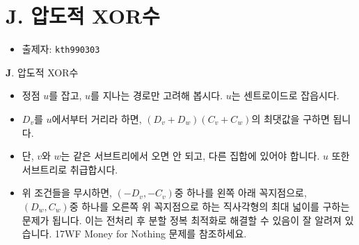 \section{J. 압도적 XOR수}

\begin{frame} %
    \begin{itemize}
        \item 출제자: \texttt{kth990303}
    \end{itemize}
\end{frame}

\begin{frame}{\textbf{J}. 압도적 XOR수}
    \begin{itemize}
        \item 정점 $u$를 잡고, $u$를 지나는 경로만 고려해 봅시다. $u$는 센트로이드로 잡읍시다.
        \item $D_v$를 $u$에서부터 거리라 하면, $(D_v+D_w)(C_v+C_w)$의 최댓값을 구하면 됩니다.
        \item 단, $v$와 $w$는 같은 서브트리에서 오면 안 되고, 다른 집합에 있어야 합니다. $u$ 또한 서브트리로 취급합시다.
        \item 위 조건들을 무시하면, $(-D_v,-C_v)$중 하나를 왼쪽 아래 꼭지점으로, $(D_w,C_w)$중 하나를 오른쪽 위 꼭지점으로 하는 직사각형의 최대 넓이를 구하는 문제가 됩니다. 이는 전처리 후 분할 정복 최적화로 해결할 수 있음이 잘 알려져 있습니다. 17WF Money for Nothing 문제를 참조하세요.
    \end{itemize}
\end{frame}